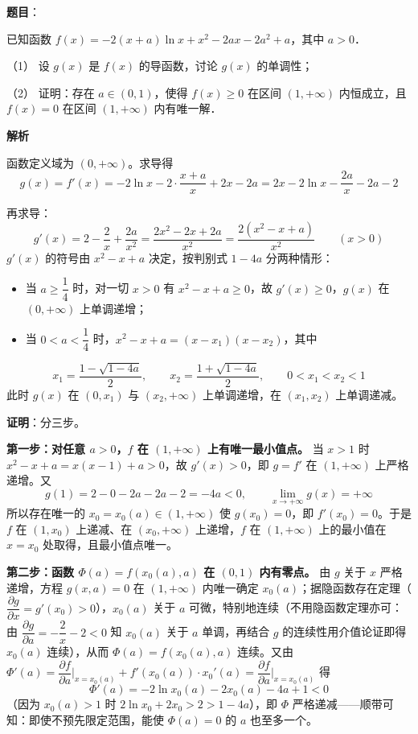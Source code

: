 \begin{answer}

\textbf{题目}：

已知函数 \(f(x)=-2(x+a)\ln x+x^2-2ax-2a^2+a\)，其中 \(a>0\)．

（1） 设 \(g(x)\) 是 \(f(x)\) 的导函数，讨论 \(g(x)\) 的单调性；

（2） 证明：存在 \(a\in(0,1)\)，使得 \(f(x)\geqslant 0\) 在区间 \((1,+\infty)\) 内恒成立，且 \(f(x)=0\) 在区间 \((1,+\infty)\) 内有唯一解．

\textbf{解析}

函数定义域为 \((0,+\infty)\)。求导得
\nopagebreak[4]
\[g(x)=f'(x)=-2\ln x-2\cdot\dfrac{x+a}x+2x-2a=2x-2\ln x-\dfrac{2a}x-2a-2\]


再求导：
\nopagebreak[4]
\[g'(x)=2-\dfrac2x+\dfrac{2a}{x^{2}}=\dfrac{2x^{2}-2x+2a}{x^{2}}=\dfrac{2(x^{2}-x+a)}{x^{2}}\qquad(x>0)\]
\(g'(x)\) 的符号由 \(x^{2}-x+a\) 决定，按判别式 \(1-4a\) 分两种情形：

\begin{itemize}
\item 当 \(a\geqslant\dfrac14\) 时，对一切 \(x>0\) 有 \(x^{2}-x+a\geqslant0\)，故 \(g'(x)\geqslant0\)，\(g(x)\) 在 \((0,+\infty)\) 上单调递增；
\item 当 \(0<a<\dfrac14\) 时，\(x^{2}-x+a=(x-x_1)(x-x_2)\)，其中
\end{itemize}
\nopagebreak[4]
\[x_1=\dfrac{1-\sqrt{1-4a}}2,\qquad x_2=\dfrac{1+\sqrt{1-4a}}2,\qquad 0<x_1<x_2<1\]
此时 \(g(x)\) 在 \((0,x_1)\) 与 \((x_2,+\infty)\) 上单调递增，在 \((x_1,x_2)\) 上单调递减。


\textbf{证明}：分三步。

\textbf{第一步：对任意 \(a>0\)，\(f\) 在 \((1,+\infty)\) 上有唯一最小值点。} 当 \(x>1\) 时 \(x^{2}-x+a=x(x-1)+a>0\)，故 \(g'(x)>0\)，即 \(g=f'\) 在 \((1,+\infty)\) 上严格递增。又
\nopagebreak[4]
\[g(1)=2-0-2a-2a-2=-4a<0,\qquad \lim_{x\to+\infty}g(x)=+\infty\]
所以存在唯一的 \(x_0=x_0(a)\in(1,+\infty)\) 使 \(g(x_0)=0\)，即 \(f'(x_0)=0\)。于是 \(f\) 在 \((1,x_0)\) 上递减、在 \((x_0,+\infty)\) 上递增，\(f\) 在 \((1,+\infty)\) 上的最小值在 \(x=x_0\) 处取得，且最小值点唯一。

\textbf{第二步：函数 \(\Phi(a)=f(x_0(a),a)\) 在 \((0,1)\) 内有零点。} 由 \(g\) 关于 \(x\) 严格递增，方程 \(g(x,a)=0\) 在 \((1,+\infty)\) 内唯一确定 \(x_0(a)\)；据隐函数存在定理（\(\dfrac{\partial g}{\partial x}=g'(x_0)>0\)），\(x_0(a)\) 关于 \(a\) 可微，特别地连续（不用隐函数定理亦可：由 \(\dfrac{\partial g}{\partial a}=-\dfrac2x-2<0\) 知 \(x_0(a)\) 关于 \(a\) 单调，再结合 \(g\) 的连续性用介值论证即得 \(x_0(a)\) 连续），从而 \(\Phi(a)=f(x_0(a),a)\) 连续。又由 \(\Phi'(a)=\dfrac{\partial f}{\partial a}\Big|_{x=x_0(a)}+f'(x_0(a))\cdot x_0'(a)=\dfrac{\partial f}{\partial a}\Big|_{x=x_0(a)}\) 得
\nopagebreak[4]
\[\Phi'(a)=-2\ln x_0(a)-2x_0(a)-4a+1<0\]
（因为 \(x_0(a)>1\) 时 \(2\ln x_0+2x_0>2>1-4a\)），即 \(\Phi\) 严格递减——顺带可知：即使不预先限定范围，能使 \(\Phi(a)=0\) 的 \(a\) 也至多一个。


\end{answer}
